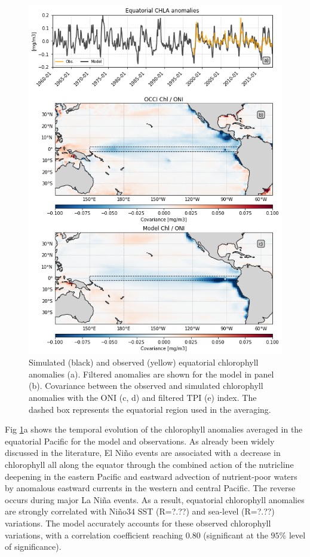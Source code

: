 \begin{figure}[h!tp]
	\centering
	\includegraphics[scale=0.4]{figs/fig2.png}
	\caption{Simulated (black) and observed (yellow) equatorial chlorophyll anomalies (a). Filtered anomalies are shown for the model in panel (b). Covariance between the observed and simulated chlorophyll anomalies with the ONI (c, d) and filtered TPI (e) index. The dashed box represents the equatorial region used in the averaging.}
	\label{fig:nemo-sat-chl}
\end{figure}

Fig \ref{fig:nemo-sat-chl}a shows the temporal evolution of the chlorophyll anomalies averaged in the equatorial Pacific for the model and observations. As already been widely discussed in the literature, El Niño events are associated with a decrease in chlorophyll all along the equator through the combined action of the nutricline deepening in the eastern Pacific and eastward advection of nutrient‐poor waters by anomalous eastward currents in the western and central Pacific. The reverse occurs during major La Niña events. As a result, equatorial chlorophyll anomalies are strongly correlated with Niño34 SST (R=?.??) and sea-level (R=?.??) variations. The model accurately accounts for these observed chlorophyll variations, with a correlation coefficient reaching $0.80$ (significant at the $95\%$ level of significance).

